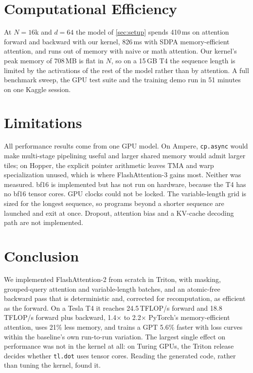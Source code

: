 \documentclass[10pt,twocolumn,letterpaper]{article}
\newcommand{\TF}{\,TFLOP/s}
\begin{document}
\section{Computational Efficiency}
\label{sec:efficiency}

At $N = 16$k and $d = 64$ the model of \cref{sec:setup} spends 410\,ms on
attention forward and backward with our kernel, 826\,ms with SDPA
memory-efficient attention, and runs out of memory with naive or math
attention. Our kernel's peak memory of 708\,MB is flat in $N$, so on a 15\,GB
T4 the sequence length is limited by the activations of the rest of the model
rather than by attention. A full benchmark sweep, the GPU test suite and the
training demo run in 51 minutes on one Kaggle session.

\section{Limitations}
\label{sec:limits}

All performance results come from one GPU model. On Ampere, \texttt{cp.async}
would make multi-stage pipelining useful and larger shared memory would admit
larger tiles; on Hopper, the explicit pointer arithmetic leaves TMA and warp
specialization unused, which is where FlashAttention-3 gains most. Neither was
measured. bf16 is implemented but has not run on hardware, because the T4 has
no bf16 tensor cores. GPU clocks could not be locked. The variable-length grid
is sized for the longest sequence, so programs beyond a shorter sequence are
launched and exit at once. Dropout, attention bias and a KV-cache decoding
path are not implemented.

\section{Conclusion}
\label{sec:conclusion}

We implemented FlashAttention-2 from scratch in Triton, with masking,
grouped-query attention and variable-length batches, and an atomic-free
backward pass that is deterministic and, corrected for recomputation, as
efficient as the forward. On a Tesla T4 it reaches 24.5\TF{} forward and
18.8\TF{} forward plus backward, 1.4$\times$ to 2.2$\times$ PyTorch's
memory-efficient attention, uses 21\% less memory, and trains a GPT 5.6\%
faster with loss curves within the baseline's own run-to-run variation. The
largest single effect on performance was not in the kernel at all: on Turing
GPUs, the Triton release decides whether \texttt{tl.dot} uses tensor cores.
Reading the generated code, rather than tuning the kernel, found it.
\end{document}
